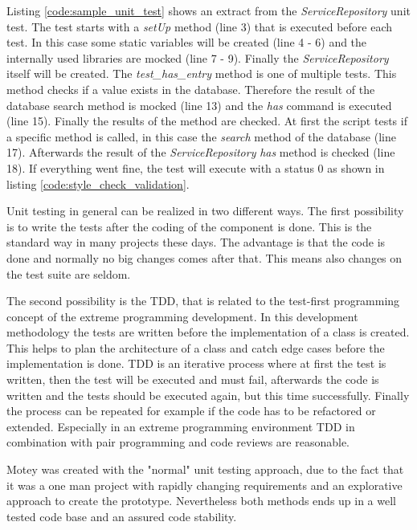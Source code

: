 Listing \ref{code:sample_unit_test} shows an extract from the \textit{ServiceRepository} unit test.
The test starts with a \textit{setUp} method (line 3) that is executed before each test.
In this case some static variables will be created (line 4 - 6) and the internally used libraries are mocked (line 7 - 9).
Finally the \textit{ServiceRepository} itself will be created.
The \textit{test\_has\_entry} method is one of multiple tests.
This method checks if a value exists in the database.
Therefore the result of the database search method is mocked (line 13) and the \textit{has} command is executed (line 15).
Finally the results of the method are checked.
At first the script tests if a specific method is called, in this case the \textit{search} method of the database (line 17).
Afterwards the result of the \textit{ServiceRepository} \textit{has} method is checked (line 18).
If everything went fine, the test will execute with a status 0 as shown in listing \ref{code:style_check_validation}.\newline

Unit testing in general can be realized in two different ways.
The first possibility is to write the tests after the coding of the component is done.
This is the standard way in many projects these days.
The advantage is that the code is done and normally no big changes comes after that.
This means also changes on the test suite are seldom.\newline

The second possibility is the \ac{TDD}, that is related to the test-first programming concept of the extreme programming development.
In this development methodology the tests are written before the implementation of a class is created.
This helps to plan the architecture of a class and catch edge cases before the implementation is done.
\ac{TDD} is an iterative process where at first the test is written, then the test will be executed and must fail, afterwards the code is written and the tests should be executed again, but this time successfully.
Finally the process can be repeated for example if the code has to be refactored or extended.
Especially in an extreme programming environment \ac{TDD} in combination with pair programming and code reviews are reasonable.\newline

Motey was created with the "normal" unit testing approach, due to the fact that it was a one man project with rapidly changing requirements and an explorative approach to create the prototype.
Nevertheless both methods ends up in a well tested code base and an assured code stability.
